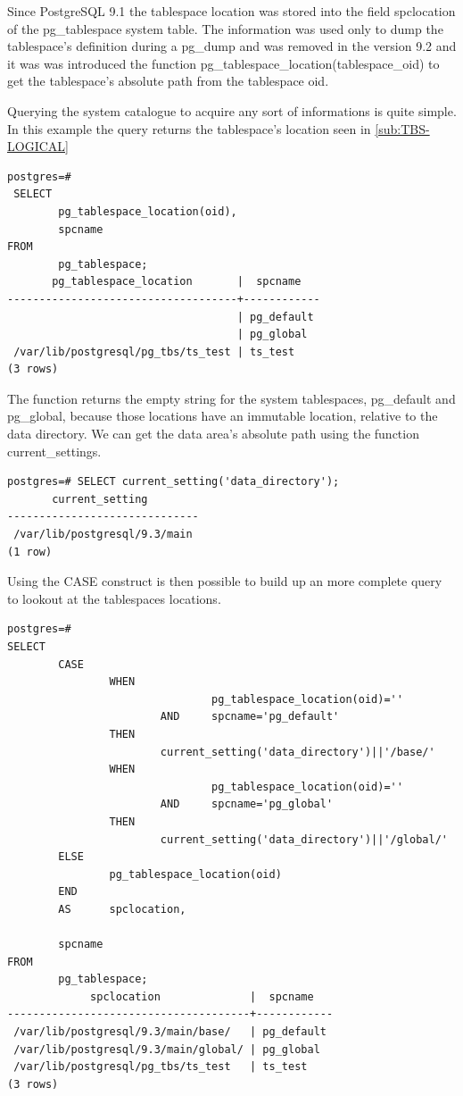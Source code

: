 Since PostgreSQL 9.1 the tablespace location was stored into the field spclocation of the 
pg\_tablespace system table. The information was used only to dump the 
tablespace's definition during a pg\_dump and was removed in the version 9.2 and it was was 
introduced the function pg\_tablespace\_location(tablespace\_oid) to get the tablespace's absolute 
path from the tablespace oid.\newline

Querying the system catalogue to acquire any sort of informations is quite  simple. In this example 
the query returns the tablespace's location seen in \ref{sub:TBS-LOGICAL} 

\begin{lstlisting}[style=pgsql]
 postgres=# 
 SELECT 
        pg_tablespace_location(oid),
        spcname 
FROM 
        pg_tablespace;
       pg_tablespace_location       |  spcname   
------------------------------------+------------
                                    | pg_default
                                    | pg_global
 /var/lib/postgresql/pg_tbs/ts_test | ts_test
(3 rows)

\end{lstlisting}

The function returns the empty string for the system tablespaces, pg\_default and pg\_global, 
because those locations have an immutable location, relative to the data directory. We can get the 
data area's absolute path using the function current\_settings. 

\begin{lstlisting}[style=pgsql]
 postgres=# SELECT current_setting('data_directory');
       current_setting        
------------------------------
 /var/lib/postgresql/9.3/main
(1 row)

\end{lstlisting}

Using the CASE construct is then possible to build up an more complete query to lookout at the 
tablespaces locations.\newpage

\begin{lstlisting}[style=pgsql]
 postgres=# 
SELECT 
        CASE
                WHEN 
                                pg_tablespace_location(oid)=''
                        AND     spcname='pg_default'
                THEN
                        current_setting('data_directory')||'/base/'
                WHEN 
                                pg_tablespace_location(oid)=''
                        AND     spcname='pg_global'
                THEN
                        current_setting('data_directory')||'/global/'
        ELSE
                pg_tablespace_location(oid)
        END
        AS      spclocation,
                
        spcname 
FROM 
        pg_tablespace;
             spclocation              |  spcname   
--------------------------------------+------------
 /var/lib/postgresql/9.3/main/base/   | pg_default
 /var/lib/postgresql/9.3/main/global/ | pg_global
 /var/lib/postgresql/pg_tbs/ts_test   | ts_test
(3 rows)

\end{lstlisting}

